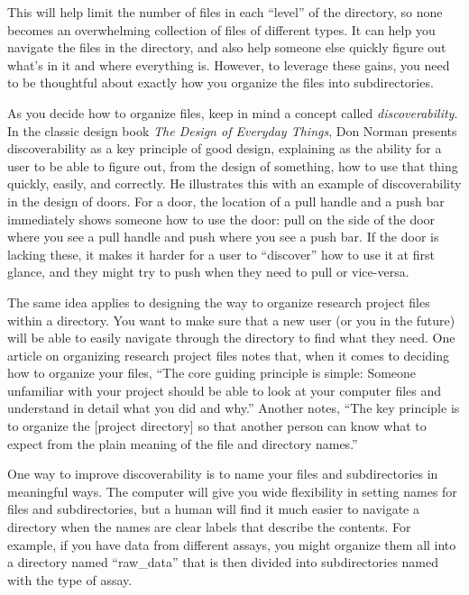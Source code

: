 \documentclass[]{tufte-book}
\begin{document}
This will help limit the number of files in each ``level'' of the directory, so
none becomes an overwhelming collection of files of different types. It can help
you navigate the files in the directory, and also help someone else quickly
figure out what's in it and where everything is. However,
to leverage these gains, you need to be thoughtful about exactly how you
organize the files into subdirectories.

As you decide how to organize files, keep in mind a concept called
\emph{discoverability}. In the classic design book \emph{The Design of Everyday
Things}, Don Norman presents discoverability as a key principle of good design,
explaining as the ability for a user to be able to figure out, from the design
of something, how to use that thing quickly, easily, and correctly. He
illustrates this with an example of discoverability in the design of doors. For
a door, the location of a pull handle and a push bar immediately shows someone
how to use the door: pull on the side of the door where you see a pull handle
and push where you see a push bar. If the door is lacking these, it makes it
harder for a user to ``discover'' how to use it at first glance, and they might
try to push when they need to pull or vice-versa.

The same idea applies to designing the way to organize research project files
within a directory. You want to make sure that a new user (or you in the future)
will be able to easily navigate through the directory to find what they need.
One article on organizing research project files notes that, when it comes to
deciding how to organize your files, ``The core guiding principle is simple:
Someone unfamiliar with your project should be able to look at your computer
files and understand in detail what you did and why.'' \citep{noble2009quick} Another
notes, ``The key principle is to organize the {[}project directory{]} so that another
person can know what to expect from the plain meaning of the file and directory
names.'' \citep{marwick2018packaging}

One way to improve discoverability is to name your files and subdirectories
in meaningful ways. The computer will give you wide flexibility in setting
names for files and subdirectories, but a human will find it much easier to
navigate a directory when the names are clear labels that describe the contents.
For example, if you have data from different assays, you might organize them
all into a directory named ``raw\_data'' that is then divided into subdirectories
named with the type of assay.
\end{document}
